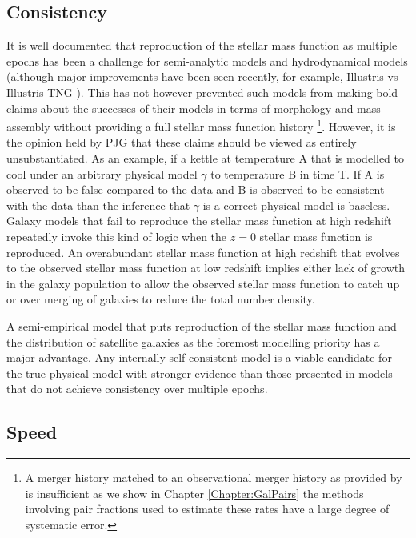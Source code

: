 \subsection{Consistency}
It is well documented that reproduction of the stellar mass function as multiple epochs has been a challenge for semi-analytic models \cite{Knebe2018CosmicModels, Asquith2018CosmicModels} and hydrodynamical models (although major improvements have been seen recently, for example, Illustris vs Illustris TNG \cite{Nelson2015TheRelease, Nelson2018TheRelease}). This has not however prevented such models from making bold claims about the successes of their models in terms of morphology and mass assembly without providing a full stellar mass function history \cite[e.g.][]{Somerville2008ANuclei, Hopkins2010MERGERSMATTER}\footnote{A merger history matched to an observational merger history as provided by \citet{Hopkins2010MERGERSMATTER} is insufficient as we show in Chapter \ref{Chapter:GalPairs} the methods involving pair fractions used to estimate these rates have a large degree of systematic error.}. However, it is the opinion held by PJG that these claims should be viewed as entirely unsubstantiated. As an example, if a kettle at temperature A that is modelled to cool under an arbitrary physical model $\gamma$ to temperature B in time T. If A is observed to be false compared to the data and B is observed to be consistent with the data than the inference that $\gamma$ is a correct physical model is baseless. Galaxy models that fail to reproduce the stellar mass function at high redshift repeatedly invoke this kind of logic when the $z=0$ stellar mass function is reproduced. An overabundant stellar mass function at high redshift that evolves to the observed stellar mass function at low redshift implies either lack of growth in the galaxy population to allow the observed stellar mass function to catch up or over merging of galaxies to reduce the total number density.

A semi-empirical model that puts reproduction of the stellar mass function and the distribution of satellite galaxies as the foremost modelling priority has a major advantage. Any internally self-consistent model is a viable candidate for the true physical model with stronger evidence than those presented in models that do not achieve consistency over multiple epochs. 

\subsection{Speed}

